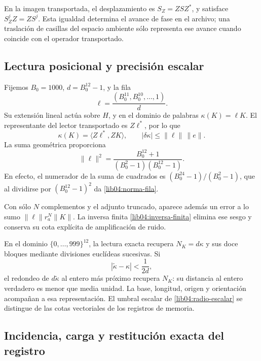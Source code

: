 En la imagen transportada, el desplazamiento es
\(S_Z=ZSZ^*\), y satisface \(S_Z^jZ=ZS^j\). Esta igualdad
determina el avance de fase en el archivo; una traslación de casillas
del espacio ambiente sólo representa ese avance cuando coincide con
el operador transportado.

\subsection{Lectura posicional y precisión escalar}
\label{lib04:kappa}

Fijemos \(B_0=1000\), \(d=B_0^{12}-1\), y la fila
\begin{equation}
 \ell=\frac{(B_0^{11},B_0^{10},\ldots,1)}{d}.
 \label{lib04:fila-posicional}
\end{equation}
Su extensión lineal actúa sobre \(H\), y en el dominio de palabras
\(\kappa(K)=\ell K\). El representante del lector transportado es
\(Z\ell^*\), por lo que
\begin{equation}
 \kappa(K)=\langle Z\ell^*,ZK\rangle,\qquad
 |\delta\kappa|\leq\|\ell\|\,\|e\|.
 \label{lib04:lectura-kappa}
\end{equation}
La suma geométrica proporciona
\begin{equation}
 \|\ell\|^2
 =\frac{B_0^{12}+1}{(B_0^2-1)(B_0^{12}-1)}.
 \label{lib04:norma-fila}
\end{equation}
En efecto, el numerador de la suma de cuadrados es
\((B_0^{24}-1)/(B_0^2-1)\), que al dividirse por
\((B_0^{12}-1)^2\) da \eqref{lib04:norma-fila}.

Con sólo \(N\) complementos y el adjunto truncado, aparece además
un error a lo sumo \(\|\ell\|r_a^N\|K\|\). La inversa finita
\eqref{lib04:inversa-finita} elimina ese sesgo y conserva su cota
explícita de amplificación de ruido.

En el dominio \(\{0,\ldots,999\}^{12}\), la lectura exacta
recupera \(N_K=d\kappa\) y sus doce bloques mediante divisiones
euclídeas sucesivas. Si
\begin{equation}
 |\widetilde\kappa-\kappa|<\frac1{2d},
 \label{lib04:radio-escalar}
\end{equation}
el redondeo de \(d\widetilde\kappa\) al entero más próximo
recupera \(N_K\): su distancia al entero verdadero es menor que
media unidad. La base, longitud, origen y orientación acompañan a
esa representación. El umbral escalar de
\eqref{lib04:radio-escalar} se distingue de las cotas vectoriales
de los registros de memoria.

\subsection{Incidencia, carga y restitución exacta del registro}
\label{lib04:incidencia}


